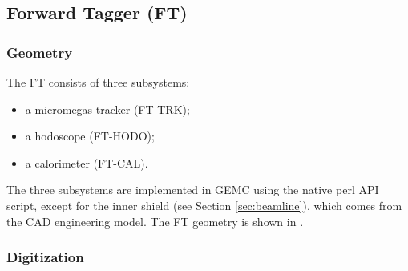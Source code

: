 \subsection{Forward Tagger (FT)}


\subsubsection{Geometry}

The FT consists of three subsystems:

\begin{itemize}
	\item a micromegas tracker (FT-TRK);
	\item a hodoscope (FT-HODO);
 	\item a calorimeter (FT-CAL).
\end{itemize}

The three subsystems are implemented in GEMC using the native perl API script, except for the inner shield (see Section \ref{sec:beamline}),
which comes from the CAD engineering model.
The FT geometry is shown in .

\subsubsection{Digitization}

